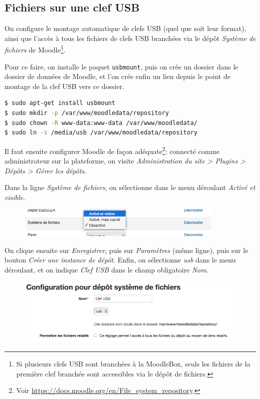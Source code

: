 \documentclass[11pt]{article}
\begin{document}
\subsection{Fichiers sur une clef USB}

On configure le montage automatique de clefs USB (quel que soit leur format), ainsi que l'accès à tous les fichiers de clefs USB branchées via le dépôt \emph{Système de fichiers} de Moodle\footnote{Si plusieurs clefs USB sont branchées à la MoodleBox, seuls les fichiers de la première clef branchée sont accessibles via le dépôt de fichiers.}.

Pour ce faire, on installe le paquet \lstinline{usbmount}, puis on crée un dossier dans le dossier de données de Moodle, et l'on crée enfin un lien depuis le point de montage de la clef USB vers ce dossier.

\begin{lstlisting}[language=bash]
$ sudo apt-get install usbmount
$ sudo mkdir -p /var/www/moodledata/repository
$ sudo chown -R www-data:www-data /var/www/moodledata/
$ sudo ln -s /media/usb /var/www/moodledata/repository
\end{lstlisting}

Il faut ensuite configurer Moodle de façon adéquate\footnote{Voir \url{https://docs.moodle.org/en/File_system_repository}.}: connecté comme administrateur sur la plateforme, on visite \emph{Administration du site > Plugins > Dépôts > Gérer les dépôts}.

Dans la ligne \emph{Système de fichiers}, on sélectionne dans le menu déroulant \emph{Activé et visible}.

\begin{figure}[!ht]
\begin{minipage}[b]{\linewidth}
\centering
\includegraphics[width=10cm]{repo-filesystem-usb-1.png}
\end{minipage}
\end{figure}

On clique ensuite sur \emph{Enregistrer}, puis sur \emph{Paramètres} (même ligne), puis sur le bouton \emph{Créer une instance de dépôt}. Enfin, on sélectionne \emph{usb} dans le menu déroulant, et on indique \emph{Clef USB} dans le champ obligatoire \emph{Nom}.

\begin{figure}[!ht]
\begin{minipage}[b]{\linewidth}
\centering
\includegraphics[width=11cm]{repo-filesystem-usb-2.png}
\end{minipage}
\end{figure}
\end{document}
